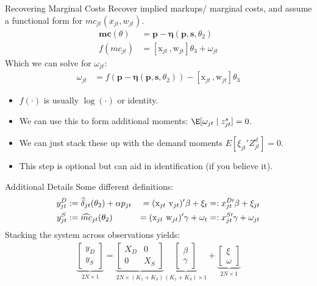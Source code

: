 \begin{frame}{Recovering Marginal Costs }
Recover implied markups/ marginal costs, and assume a functional form for $mc_{jt}(x_{jt},w_{jt})$.
\begin{align*}
\mathbf{mc}(\theta)&= \mathbf{p}- \boldsymbol{\eta}(\mathbf{p},\mathbf{s},\theta_2)\\
f(mc_{jt}) &= [\textrm{x}_{jt} \,, \textrm{w}_{jt}] \theta_3 + \omega_{jt}
\end{align*}
Which we can solve for $\omega_{jt}$:
\begin{align*}
\omega_{jt} &=  f(\mathbf{p}- \boldsymbol{\eta}(\mathbf{p},\mathbf{s},\theta_2) ) -[\textrm{x}_{jt} \,, \textrm{w}_{jt}] \theta_3 
\end{align*}
\begin{itemize}
\item $f(\cdot)$ is usually $\log(\cdot)$ or identity.
\item We can use this to form additional moments: $\E[\omega_{jt} \mid  z_{jt}^{s}]=0$.
\item We can just stack these up with the demand moments $E[\xi_{jt}' Z_{jt}^d]=0$.
\item This step is optional but can aid in identification (if you believe it).
\end{itemize}
\end{frame}


\begin{frame}{Additional Details}
Some different definitions:
\begin{alignat}{3}
\label{eq:stacked}
\nonumber y_{jt}^D &:= \widehat \delta_{jt}(\theta_2) + \alpha p_{jt} &=(\textrm{x}_{jt} \-\ \textrm{v}_{jt})' \beta + \xi_t &=: x_{jt}^{D\prime}\beta + \xi_{jt} \\ 
y_{jt}^S &:= \widehat{mc}_{jt}(\theta_2) &= (\textrm{x}_{jt} \-\ \textrm{w}_{jt})'\gamma + \omega_t &=: x_{jt}^{S\prime} \gamma + \omega_{jt} 
\end{alignat}
Stacking the system across observations yields:
\begin{align}
\underbrace{\begin{bmatrix} y_D \\ y_S \end{bmatrix}}_{2N\times1} = 
\underbrace{\begin{bmatrix}
X_D & 0 \\
0 & X_S 
\end{bmatrix}}_{2N\times(K_1+K_3)}
\underbrace{\begin{bmatrix}
\beta \\ \gamma %
\end{bmatrix}}_{(K_1+K_3)\times1} + 
\underbrace{\begin{bmatrix}
\xi \\ \omega %
\end{bmatrix}}_{2N\times 1}
\end{align}
\end{frame}



